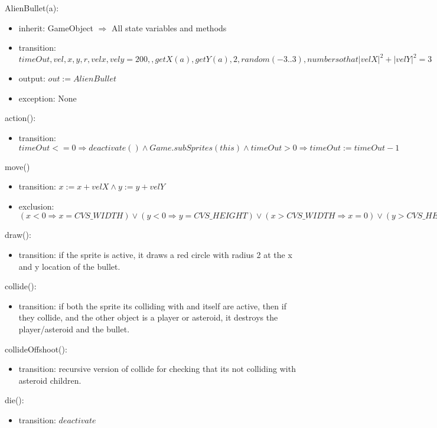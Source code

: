 \documentclass[12pt]{article}
\begin{document}
AlienBullet(a):
\begin{itemize}
    \item inherit: GameObject $\Rightarrow$ All state variables and methods
    \item transition: $ timeOut, vel, x, y, r, velx, vely = 200, {}, getX(a), getY(a), 2, random(-3..3), number so that |velX|^2 + |velY|^2 = 3$
    \item output: $out := AlienBullet$
    \item exception: None
\end{itemize}

\noindent action():
\begin{itemize}
    \item transition: $timeOut <=0 \Rightarrow deactivate() \land Game.subSprites(this) \land timeOut > 0 \Rightarrow timeOut := timeOut - 1$
\end{itemize}

\noindent move()
\begin{itemize}
    \item transition: $x := x + velX \land y := y + velY$
    \item exclusion: $(x < 0 \Rightarrow x = CVS\_WIDTH) \lor (y < 0 \Rightarrow y = CVS\_HEIGHT) \lor (x > CVS\_WIDTH \Rightarrow x = 0) \lor (y > CVS\_HEIGHT \Rightarrow y = 0)$
\end{itemize}

\noindent draw():
\begin{itemize}
    \item transition: if the sprite is active, it draws a red circle with radius 2 at the x and y location of the bullet.
\end{itemize}

\noindent collide():
\begin{itemize}
    \item transition: if both the sprite its colliding with and itself are active, then if they collide, and the other object is a player or asteroid, it destroys the player/asteroid and the bullet.
\end{itemize}

\noindent collideOffshoot():
\begin{itemize}
    \item transition: recursive version of collide for checking that its not colliding with asteroid children.
\end{itemize}

\noindent die():
\begin{itemize}
    \item transition: $deactivate$
\end{itemize}
\end{document}
